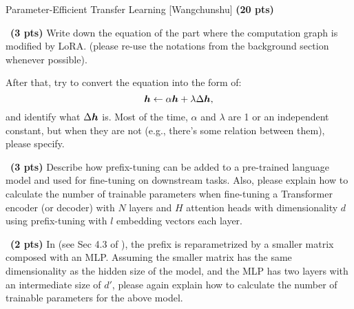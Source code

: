 \begin{question}{
Parameter-Efficient Transfer Learning [Wangchunshu] \textbf{(20 pts)}}
\begin{subquestion}{~\small \textbf{(3 pts)}}
Write down the equation of the part where the computation graph is modified by LoRA. (please re-use the notations from the background section whenever possible).

After that, try to convert the equation into the form of:
\begin{equation}
\label{eq:lora}
    {\bm{h}} \leftarrow \alpha {\bm{h}} + \lambda \Delta{\bm{h}},
\end{equation}
and identify what $\Delta{\bm{h}}$ is. Most of the time, $\alpha$ and $\lambda$ are 1 or an independent constant, but when they are not (e.g., there's some relation between them), please specify.

\end{subquestion}




\begin{subquestion}{~\small \textbf{(3 pts)}}
Describe how prefix-tuning can be added to a pre-trained language model and used for fine-tuning on downstream tasks. Also, please explain how to calculate the number of trainable parameters when fine-tuning a Transformer encoder (or decoder) with $N$ layers and $H$ attention heads with dimensionality $d$ using prefix-tuning with $l$ embedding vectors each layer. 

\end{subquestion}



\begin{subquestion}{~\small \textbf{(2 pts)}}
In \cite{li-liang-2021-prefix} (see Sec 4.3 of \cite{li-liang-2021-prefix}), the prefix is reparametrized by a smaller matrix composed with an MLP. Assuming the smaller matrix has the same dimensionality as the hidden size of the model, and the MLP has two layers with an intermediate size of $d'$, please again explain how to calculate the number of trainable parameters for the above model.


\end{subquestion}
\end{question}
